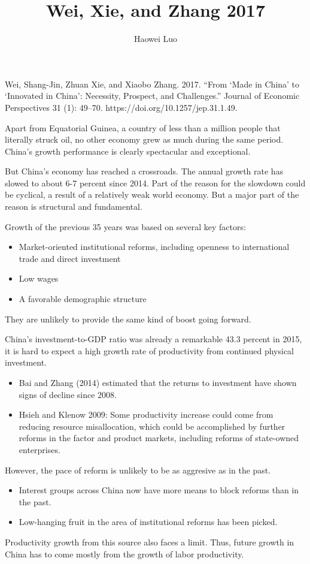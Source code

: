 \documentclass{article}
\title{Wei, Xie, and Zhang 2017}
\author{Haowei Luo}
\begin{document}
    \maketitle
    Wei, Shang-Jin, Zhuan Xie, and Xiaobo Zhang. 2017. “From ‘Made in China’ to ‘Innovated in China’: Necessity, Prospect, and Challenges.” Journal of Economic Perspectives 31 (1): 49–70. https://doi.org/10.1257/jep.31.1.49.

    Apart from Equatorial Guinea, a country of less than a million people that literally struck oil, no other economy grew as much during the same period. China’s growth performance is clearly spectacular and exceptional.

    But China's economy has reached a crossroads. The annual growth rate has slowed to about 6-7 percent since 2014. Part of the reason for the slowdown could be cyclical, a result of a relatively weak world economy. But a major part of the reason is structural and fundamental.
    
    Growth of the previous 35 years was based on several key factors:
    \begin{itemize}
        \item Market-oriented institutional reforms, including openness to international trade and direct investment
        \item Low wages
        \item A favorable demographic structure
    \end{itemize}
    They are unlikely to provide the same kind of boost going forward.

    China’s investment-to-GDP ratio was already a remarkable 43.3 percent in 2015, it is hard to expect a high growth rate of productivity from continued physical investment.
    \begin{itemize}
        \item Bai and Zhang (2014) estimated that the returns to investment have shown signs of decline since 2008.
        \item Hsieh and Klenow 2009: Some productivity increase could come from reducing resource misallocation, which could be accomplished by further reforms in the factor and product markets, including reforms of state-owned enterprises.
    \end{itemize}
    However, the pace of reform is unlikely to be as aggresive as in the past.
    \begin{itemize}
        \item Interest groups across China now have more means to block reforms than in the past.
        \item Low-hanging fruit in the area of institutional reforms has been picked.
    \end{itemize}
    Productivity growth from this source also faces a limit. Thus, future growth in China has to come mostly from the growth of labor productivity.
\end{document}
